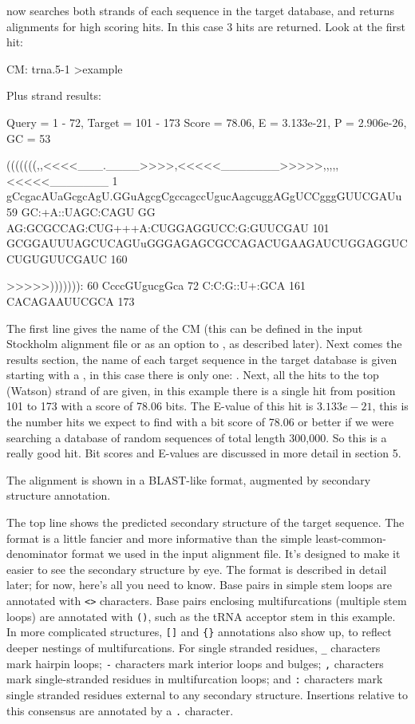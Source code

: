  now searches both strands of each sequence in the
target database, and returns alignments for high scoring hits.  In
this case 3 hits are returned. Look at the first hit:
\begin{sreoutput}
CM: trna.5-1
>example

  Plus strand results:

 Query = 1 - 72, Target = 101 - 173
 Score = 78.06, E = 3.133e-21, P = 2.906e-26, GC =  53

           (((((((,,<<<<___.____>>>>,<<<<<_______>>>>>,,,,,<<<<<_______
         1 gCcgacAUaGcgcAgU.GGuAgcgCgccagccUgucAagcuggAGgUCCgggGUUCGAUu 59      
           GC:+A::UAGC:CAGU GG AG:GCGCCAG:CUG+++A:CUGGAGGUCC:G:GUUCGAU 
       101 GCGGAUUUAGCUCAGUuGGGAGAGCGCCAGACUGAAGAUCUGGAGGUCCUGUGUUCGAUC 160     

           >>>>>))))))):
        60 CcccGUgucgGca 72      
           C:C:G::U+:GCA
       161 CACAGAAUUCGCA 173     

\end{sreoutput}

The first line gives the name of the CM (this can be defined in the
input Stockholm alignment file or as an option to , as
described later). Next comes the results section, the name of each
target sequence in the target database is given starting with a
\prog{$>$}, in this case there is only one: . Next, all
the hits to the top (Watson) strand of  are given, in
this example there is a single hit from position 101 to 173 with a
score of 78.06 bits. The E-value of this hit is $3.133e-21$, this is
the number hits we expect to find with a bit score of 78.06 or better
if we were searching a database of random sequences of total length
300,000. So this is a really good hit. Bit scores and E-values are
discussed in more detail in section 5.

The alignment is shown in a BLAST-like format, augmented by secondary
structure annotation. 

The top line shows the predicted secondary structure of the target
sequence. The format is a little fancier and more informative than the
simple least-common-denominator format we used in the input alignment
file. It's designed to make it easier to see the
secondary structure by eye. The format is described in detail later;
for now, here's all you need to know. Base pairs in simple stem loops
are annotated with \verb+<>+ characters. Base pairs enclosing
multifurcations (multiple stem loops) are annotated with \verb+()+,
such as the tRNA acceptor stem in this example. In more complicated
structures, \verb+[]+ and \verb+{}+ annotations also show up, to
reflect deeper nestings of multifurcations. For single stranded
residues, \verb+_+ characters mark hairpin loops; \verb+-+ characters mark
interior loops and bulges; \verb+,+ characters mark single-stranded residues
in multifurcation loops; and \verb+:+ characters mark single stranded
residues external to any secondary structure. Insertions relative to
this consensus are annotated by a \verb+.+ character.

